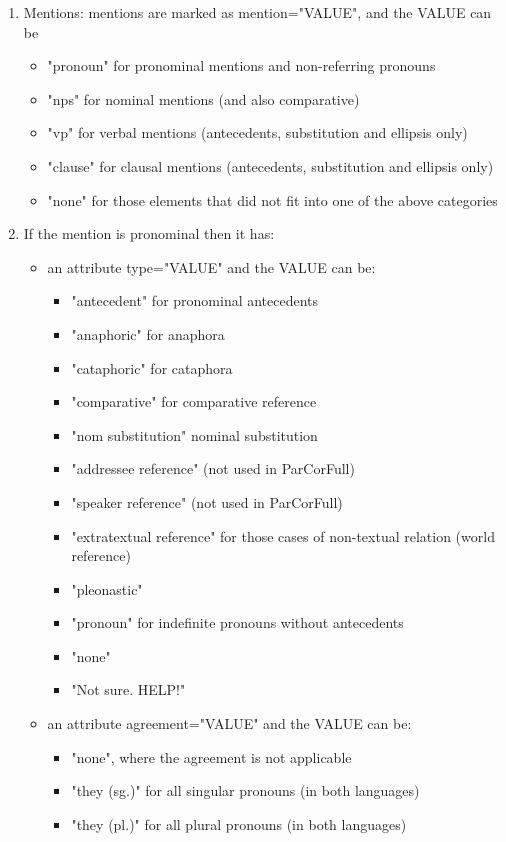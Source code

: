 \documentclass[a4paper]{article}
\begin{document}
{{\begin{enumerate}
\item Mentions: mentions are marked as mention="VALUE", and the VALUE can be 
\begin{itemize}
\item "pronoun" for pronominal mentions and non-referring pronouns
\item "nps" for nominal mentions (and also comparative)
\item "vp" for verbal mentions (antecedents, substitution and ellipsis  only)
\item "clause" for clausal mentions (antecedents, substitution and ellipsis  only)
\item "none" for those elements that did not fit into one of the above categories 
\end{itemize}

\item If the mention is pronominal then it has:
\begin{itemize}
\item  an attribute type="VALUE" and the VALUE can be:
\begin{itemize}
\item "antecedent" for pronominal antecedents 
\item "anaphoric" for anaphora
\item "cataphoric" for cataphora
\item "comparative" for comparative reference
\item"nom substitution" nominal substitution
\item "addressee reference" (not used in ParCorFull)
\item "speaker reference"  (not used in ParCorFull)
\item "extratextual reference" for those cases of non-textual relation (world reference)
\item "pleonastic"
\item "pronoun" for indefinite pronouns without antecedents
\item "none"
 \item "Not sure. HELP!"
 \end{itemize}
 
 \item an attribute agreement="VALUE" and the VALUE can be:
 \begin{itemize}
 \item  "none", where the agreement is not applicable
  \item "they (sg.)" for all singular pronouns (in both languages)
\item "they (pl.)" for all plural pronouns (in both languages)
 \end{itemize}
 

\end{itemize}
\end{enumerate}}}
\end{document}
